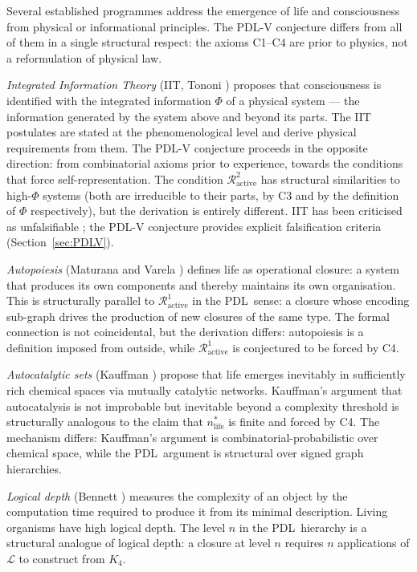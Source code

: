 \documentclass[12pt,a4paper]{article}
\theoremstyle{plain}
\theoremstyle{definition}
\theoremstyle{remark}
\newcommand{\PDL}{\textsc{PDL}}
\newcommand{\Kfour}{K_4}
\newcommand{\Rop}{\mathcal{R}}
\newcommand{\Lop}{\mathcal{L}}
\begin{document}
Several established programmes address the emergence of life and consciousness from
physical or informational principles. The \PDL-V conjecture differs from all of them
in a single structural respect: the axioms C1--C4 are prior to physics, not a
reformulation of physical law.

\emph{Integrated Information Theory} (IIT, Tononi \cite{Tononi2004}) proposes that
consciousness is identified with the integrated information $\Phi$ of a physical
system --- the information generated by the system above and beyond its parts. The
IIT postulates are stated at the phenomenological level and derive physical
requirements from them. The \PDL-V conjecture proceeds in the opposite direction:
from combinatorial axioms prior to experience, towards the conditions that force
self-representation. The condition $\Rop^2_{\mathrm{active}}$ has structural
similarities to high-$\Phi$ systems (both are irreducible to their parts, by C3 and
by the definition of $\Phi$ respectively), but the derivation is entirely different.
IIT has been criticised as unfalsifiable \cite{IIT2023}; the \PDL-V conjecture
provides explicit falsification criteria (Section~\ref{sec:PDLV}).

\emph{Autopoiesis} (Maturana and Varela \cite{Maturana1980}) defines life as
operational closure: a system that produces its own components and thereby maintains
its own organisation. This is structurally parallel to $\Rop^1_{\mathrm{active}}$ in
the \PDL\ sense: a closure whose encoding sub-graph drives the production of new
closures of the same type. The formal connection is not coincidental, but the
derivation differs: autopoiesis is a definition imposed from outside, while
$\Rop^1_{\mathrm{active}}$ is conjectured to be forced by C4.

\emph{Autocatalytic sets} (Kauffman \cite{Kauffman1993}) propose that life emerges
inevitably in sufficiently rich chemical spaces via mutually catalytic networks.
Kauffman's argument that autocatalysis is not improbable but inevitable beyond a
complexity threshold is structurally analogous to the claim that $n^{*}_{\mathrm{life}}$
is finite and forced by C4. The mechanism differs: Kauffman's argument is
combinatorial-probabilistic over chemical space, while the \PDL\ argument is
structural over signed graph hierarchies.

\emph{Logical depth} (Bennett \cite{Bennett1988}) measures the complexity of an
object by the computation time required to produce it from its minimal description.
Living organisms have high logical depth. The level $n$ in the \PDL\ hierarchy is a
structural analogue of logical depth: a closure at level $n$ requires $n$ applications
of $\Lop$ to construct from $\Kfour$.
\end{document}
